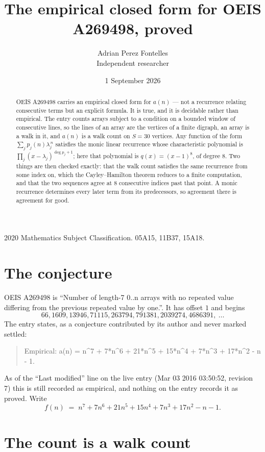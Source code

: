 \documentclass[11pt,a4paper]{article}
\title{The empirical closed form for OEIS A269498, proved}
\author{Adrian Perez Fontelles\\ \small Independent researcher}
\date{1 September 2026}
\theoremstyle{plain}
\theoremstyle{definition}
\begin{document}
\maketitle

\begin{abstract}
OEIS A269498 carries an empirical closed form for $a(n)$ --- not a recurrence relating
consecutive terms but an explicit formula. It is true, and it is decidable rather than
empirical. The entry counts arrays subject to a condition on a bounded window of consecutive lines, so the lines of an array are the
vertices of a finite digraph, an array is a walk in it, and $a(n)$ is a walk count on
$S=30$ vertices. Any function of the form $\sum_j p_j(n)\lambda_j^{\,n}$ satisfies the
monic linear recurrence whose characteristic polynomial is
$\prod_j(x-\lambda_j)^{\deg p_j+1}$; here that polynomial is $q(x)=(x-1)^{8}$, of degree
$8$. Two things are then checked exactly: that the walk count satisfies the same
recurrence from some index on, which the Cayley--Hamilton theorem reduces to a finite
computation, and that the two sequences agree at $8$ consecutive indices past that
point. A monic recurrence determines every later term from its predecessors, so agreement
there is agreement for good.
\end{abstract}

\noindent\small 2020 Mathematics Subject Classification. 05A15, 11B37, 15A18.\normalsize

\section{The conjecture}

OEIS A269498 is ``Number of length-7 0..n arrays with no repeated value differing from the previous repeated value by one.''. It has offset $1$ and begins
\[
66, 1609, 13946, 71115, 263794, 791381, 2039274, 4686391,\ \dots
\]
The entry states, as a conjecture contributed by its author and never marked settled:
\begin{quote}
Empirical: a(n) = n\^{}7 + 7*n\^{}6 + 21*n\^{}5 + 15*n\^{}4 + 7*n\^{}3 + 17*n\^{}2 - n - 1.
\end{quote}
As of the ``Last modified'' line on the live entry (Mar 03 2016 03:50:52, revision 7) this is still
recorded as empirical, and nothing on the entry records it as proved. Write
\[
f(n)\;=\;n^{7} + 7 n^{6} + 21 n^{5} + 15 n^{4} + 7 n^{3} + 17 n^{2} - n - 1.
\]

\section{The count is a walk count}
\end{document}
